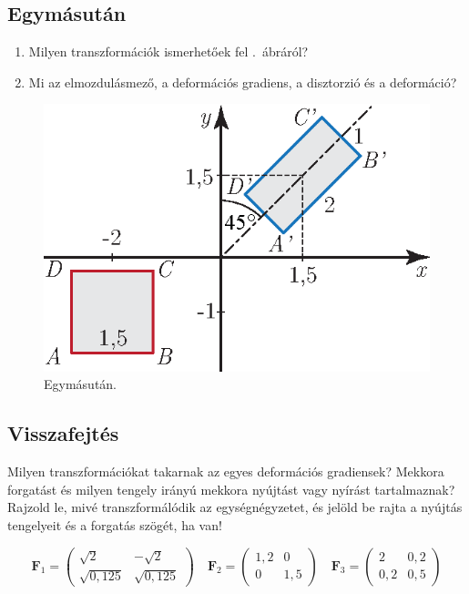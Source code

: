 \documentclass[12pt,a4paper]{scrartcl}
\let\mathbf\bm
\begin{document}
\subsection{Egymásután}
\begin{enumerate}
\item Milyen transzformációk ismerhetőek fel .\ ábráról?
\item Mi az elmozdulásmező, a deformációs gradiens, a disztorzió és a deformáció?
\end{enumerate}
\begin{figure}[htb] 
\centering    
\includegraphics[scale=1]{figs/egymasutan_feladat.eps}
\caption{Egymásután.}
\label{fig:egymasutan}
\end{figure}
\FloatBarrier

\subsection{Visszafejtés}
Milyen transzformációkat takarnak az egyes deformációs gradiensek? Mekkora forgatást és milyen tengely irányú mekkora nyújtást vagy nyírást tartalmaznak? Rajzold le, mivé transzformálódik az egységnégyzetet, és jelöld be rajta a nyújtás tengelyeit és a forgatás szögét, ha van!

\[{{\mathbf{F}}_1} = \left( {\begin{array}{*{20}{c}}
  {\sqrt 2 }&-{\sqrt 2 } \\ 
  {\sqrt {0,125} }&{ \sqrt {0,125} } 
\end{array}} \right)\quad {{\mathbf{F}}_2} = \left( {\begin{array}{*{20}{c}}
  {1,2}&0 \\ 
  0&{1,5} 
\end{array}} \right)\quad {{\mathbf{F}}_3} = \left( {\begin{array}{*{20}{c}}
  2&{0,2} \\ 
  {0,2}&{0,5} 
\end{array}} \right)\]
\end{document}
